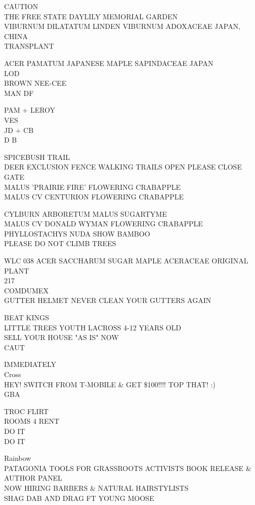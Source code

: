 \documentclass[10pt,letterpaper]{article}
\begin{document}
CAUTION\\
THE FREE STATE DAYLILY MEMORIAL GARDEN\\
VIBURNUM DILATATUM LINDEN VIBURNUM ADOXACEAE JAPAN, CHINA\\
TRANSPLANT

ACER PAMATUM JAPANESE MAPLE SAPINDACEAE JAPAN\\
LOD\\
BROWN NEE{-}CEE\\
MAN DF

PAM + LEROY\\
VES\\
JD + CB\\
D B

SPICEBUSH TRAIL\\
DEER EXCLUSION FENCE WALKING TRAILS OPEN PLEASE CLOSE GATE\\
MALUS 'PRAIRIE FIRE' FLOWERING CRABAPPLE\\
MALUS CV CENTURION FLOWERING CRABAPPLE

CYLBURN ARBORETUM MALUS SUGARTYME\\
MALUS CV DONALD WYMAN FLOWERING CRABAPPLE\\
PHYLLOSTACHYS NUDA SHOW BAMBOO\\
PLEASE DO NOT CLIMB TREES

WLC 038 ACER SACCHARUM SUGAR MAPLE ACERACEAE ORIGINAL PLANT\\
217\\
COMDUMEX\\
GUTTER HELMET NEVER CLEAN YOUR GUTTERS AGAIN

BEAT KINGS\\
LITTLE TREES YOUTH LACROSS 4{-}12 YEARS OLD\\
SELL YOUR HOUSE "AS IS" NOW\\
CAUT

IMMEDIATELY\\
Cross\\
HEY!  SWITCH FROM T{-}MOBILE \& GET \$100!!!! TOP THAT! :)\\
GBA

TROC FLIRT\\
ROOMS 4 RENT\\
DO IT\\
DO IT

Rainbow\\
PATAGONIA TOOLS FOR GRASSROOTS ACTIVISTS BOOK RELEASE \& AUTHOR PANEL\\
NOW HIRING BARBERS \& NATURAL HAIRSTYLISTS\\
SHAG DAB AND DRAG FT YOUNG MOOSE
\end{document}
